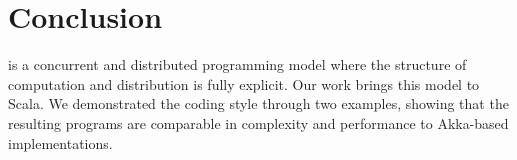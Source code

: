 \section*{Conclusion}
\apgas is a concurrent and distributed programming model where the structure of
computation and distribution is fully explicit. Our work brings this model to
Scala. We demonstrated the coding style through two examples, showing that the
resulting programs are comparable in complexity and performance to Akka-based
implementations.
